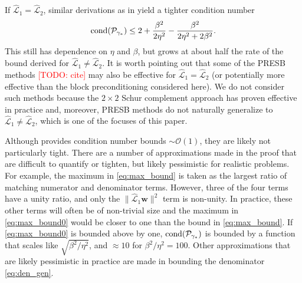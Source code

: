 \documentclass[review]{siamart}
\makeatletter
\newcommand{\todo}[1]{\textcolor{red}{[TODO\@: #1]}}
\makeatother
\begin{document}
%
\begin{remark}[$\widehat{\mathcal{L}}_1 = \widehat{\mathcal{L}}_2$]
If $\widehat{\mathcal{L}}_1 = \widehat{\mathcal{L}}_2$, similar derivations as in
 yield a tighter condition number
\begin{align*}
\textnormal{cond}(\mathcal{P}_{\gamma_*}) \leq
	2+\frac{\beta^2}{2\eta^2} - \frac{\beta^2}{2\eta^2 + 2\beta^2}.
\end{align*}
This still has dependence on $\eta$ and $\beta$, but grows at about half the rate
of the bound derived for $\widehat{\mathcal{L}}_1 \neq \widehat{\mathcal{L}}_2$.
It is worth pointing out that some of the PRESB methods \todo{cite} may also be
effective for $\widehat{\mathcal{L}}_1 = \widehat{\mathcal{L}}_2$ (or potentially
more effective than the block preconditioning considered here). We do not consider
such methods because the $2\times 2$ Schur complement approach has proven effective
in practice and, moreover, PRESB methods do not naturally generalize to
$\widehat{\mathcal{L}}_1 \neq \widehat{\mathcal{L}}_2$, which is one of the
focuses of this paper.
\end{remark}
%

%
\begin{remark}
Although  provides condition number bounds $\sim\mathcal{O}(1)$, they
are likely not particularly tight. There are a number of approximations made in the
proof that are difficult to quantify or tighten, but likely pessimistic for realistic
problems. For example,
the maximum in \eqref{eq:max_bound} is taken as the largest ratio of matching numerator
and denominator terms. However, three of the four terms have a unity ratio, and only
the $\|\widehat{\mathcal{L}}_1\mathbf{w}\|^2$ term is non-unity. In practice, these
other terms will often be of non-trivial size and the maximum in \eqref{eq:max_bound0}
would be closer to one than the bound in \eqref{eq:max_bound}. If \eqref{eq:max_bound0}
is bounded above by one, $\textnormal{cond}(\mathcal{P}_{\gamma_*})$ is bounded
by a function that scales like $\sqrt{\beta^2/\eta^2}$, and $\approx 10$ for
$\beta^2/\eta^2 = 100$. Other approximations that are likely pessimistic in practice
are made in bounding the denominator \eqref{eq:den_gen}.
\end{remark}
%


\end{document}
